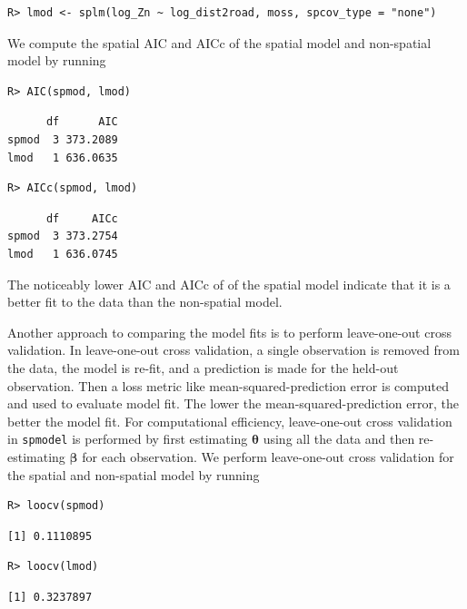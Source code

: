 \documentclass{article}
\begin{document}
\begin{verbatim}
R> lmod <- splm(log_Zn ~ log_dist2road, moss, spcov_type = "none")
\end{verbatim}

We compute the spatial AIC and AICc of the spatial model and non-spatial
model by running

\begin{verbatim}
R> AIC(spmod, lmod)
\end{verbatim}

\begin{verbatim}
      df      AIC
spmod  3 373.2089
lmod   1 636.0635
\end{verbatim}

\begin{verbatim}
R> AICc(spmod, lmod)
\end{verbatim}

\begin{verbatim}
      df     AICc
spmod  3 373.2754
lmod   1 636.0745
\end{verbatim}

The noticeably lower AIC and AICc of of the spatial model indicate that
it is a better fit to the data than the non-spatial model.

Another approach to comparing the model fits is to perform leave-one-out
cross validation. In leave-one-out cross validation, a single
observation is removed from the data, the model is re-fit, and a
prediction is made for the held-out observation. Then a loss metric like
mean-squared-prediction error is computed and used to evaluate model
fit. The lower the mean-squared-prediction error, the better the model
fit. For computational efficiency, leave-one-out cross validation in
\texttt{spmodel} is performed by first estimating
\(\boldsymbol{\theta}\) using all the data and then re-estimating
\(\boldsymbol{\beta}\) for each observation. We perform leave-one-out
cross validation for the spatial and non-spatial model by running

\begin{verbatim}
R> loocv(spmod)
\end{verbatim}

\begin{verbatim}
[1] 0.1110895
\end{verbatim}

\begin{verbatim}
R> loocv(lmod)
\end{verbatim}

\begin{verbatim}
[1] 0.3237897
\end{verbatim}
\end{document}
